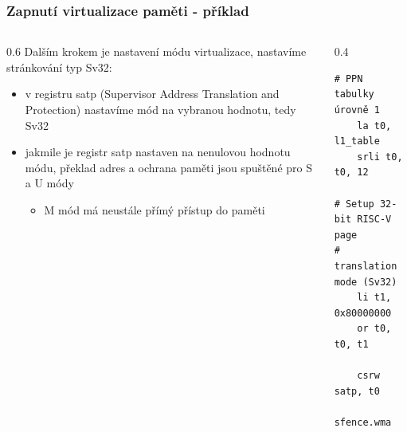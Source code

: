\documentclass[aspectratio=169]{beamer}
\begin{document}
\begin{frame}[fragile]
\frametitle{Zapnutí virtualizace paměti - příklad}

\begin{columns}[t]
\begin{column}{0.6\textwidth}
Dalším krokem je nastavení módu virtualizace, nastavíme stránkování typ Sv32:
\begin{itemize}
\item v registru satp (Supervisor Address Translation and Protection) nastavíme mód na vybranou hodnotu, tedy Sv32
\item jakmile je registr satp nastaven na nenulovou hodnotu módu, překlad adres a ochrana paměti jsou spuštěné pro S a U módy
\begin{itemize}
\item M mód má neustále přímý přístup do paměti
\end{itemize}
\end{itemize}
\end{column}
\hfill
\begin{column}{0.4\textwidth}
\begin{verbatim}
# PPN tabulky úrovně 1
    la t0, l1_table
    srli t0, t0, 12

# Setup 32-bit RISC-V page
# translation mode (Sv32)
    li t1, 0x80000000
    or t0, t0, t1

    csrw satp, t0
    sfence.wma
\end{verbatim}
\end{column}
\end{columns}
\end{frame}
\end{document}
